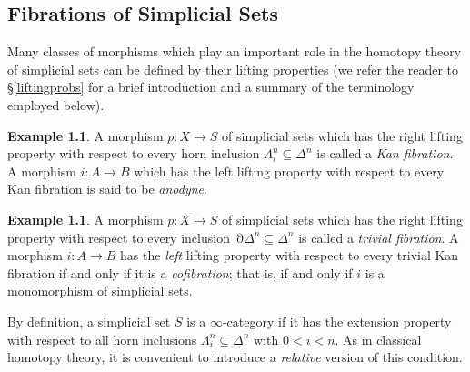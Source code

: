 \documentclass{report}[10pt, final]
\DeclareMathOperator{\bd}{\partial}
\theoremstyle{definition}
\newtheorem{example}[theorem]{Example}
\begin{document}


\begin{Didn't Read}

\chapter{Fibrations of Simplicial Sets}\label{chap2}

\setcounter{theorem}{0}
\setcounter{subsection}{0}


%

 Many classes of morphisms which play an important role in the homotopy theory of simplicial sets can be defined by their lifting properties (we refer the reader to \S \ref{liftingprobs} for a brief introduction and a summary of the terminology employed below). 

\begin{example} 
A morphism $p: X \rightarrow S$ of simplicial sets which has the right
lifting property with respect to every horn inclusion $\Lambda^n_i \subseteq \Delta^n$ is called a {\it Kan fibration}. A morphism $i: A \rightarrow B$ which has the left lifting property with respect to every Kan fibration is said to be {\it anodyne}.
\end{example}

\begin{example}
A morphism $p: X \rightarrow S$ of simplicial sets which has the right
lifting property with respect to every inclusion $\bd \Delta^n \subseteq \Delta^n$ is called a {\it trivial fibration}.
A morphism $i: A \rightarrow B$ has the {\em left} lifting property with respect to every trivial Kan fibration if and only if it is a {\it cofibration}; that is, if and only if $i$ is a monomorphism of simplicial sets.
\end{example}

By definition, a simplicial set $S$ is a $\infty$-category if it has
the extension property with respect to all horn inclusions
$\Lambda^n_i \subseteq \Delta^n$ with $0 < i < n$. As in classical homotopy theory, it is
convenient to introduce a {\em relative} version of this condition.


\end{Didn't Read}
\end{document}
